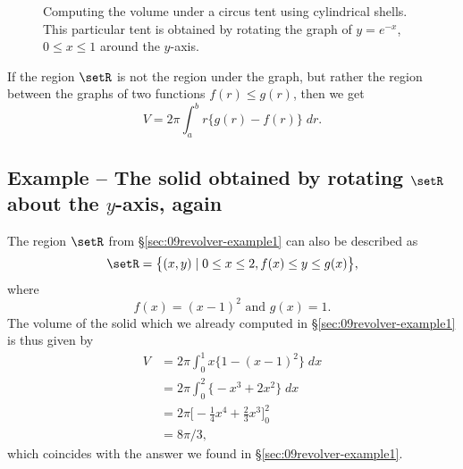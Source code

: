 \begin{figure}[t]\centering
  
  \parbox{175pt}{ }
  \parbox{175pt}{ }
  
  \caption{Computing the volume under a circus tent using cylindrical shells.
    This particular tent is obtained by rotating the graph of $y=e^{-x}$, $0\le
    x\le 1$ around the $y$-axis.}
  \label{fig:09cylindricalshells}
\end{figure}

If the region $\setR$ is not the region under the graph, but rather the region
between the graphs of two functions $f(r)\leq g(r)$, then we get
\[
V = 2\pi\int_a^b r\bigl\{g(r) - f(r)\bigr\} \;dr.
\]

\subsection{Example -- The solid obtained by rotating $\setR$ about the $y$-axis, again}
The region $\setR$ from \S\ref{sec:09revolver-example1} can also be described as
\[
\setR = \bigl\{(x, y) \mid 0\leq x\leq 2, f(x)\leq y\leq g(x)\bigr\},
\]
where
\[
f(x) = (x-1)^2\text{ and }g(x) = 1.
\]
The volume of the solid which we already computed in
\S\ref{sec:09revolver-example1} is thus given by
\begin{align*}
  V &= 2\pi \int_0^1 x\bigl\{1-(x-1)^2\bigr\}\;dx\\
  &= 2\pi \int_0^2 \bigl\{-x^3+2x^2\bigr\}\;dx\\
  &= 2\pi\bigl[-\tfrac14x^4+\tfrac23x^3\bigr]_0^2\\
  &= 8\pi/3,
\end{align*}
which coincides with the answer we found in \S\ref{sec:09revolver-example1}.




